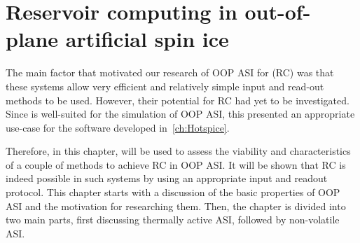 \chapter{Reservoir computing in out-of-plane artificial spin ice}\label{ch:Applications} %

The main factor that motivated our research of OOP ASI for  (RC) was that these systems allow very efficient and relatively simple input and read-out methods to be used.
However, their potential for RC had yet to be investigated.
Since \hotspice is well-suited for the simulation of OOP ASI, this presented an appropriate use-case for the software developed in~\cref{ch:Hotspice}. \par %
Therefore, in this chapter, \hotspice will be used to assess the viability and characteristics of a couple of methods to achieve RC in OOP ASI.
It will be shown that RC is indeed possible in such systems by using an appropriate input and readout protocol.
This chapter starts with a discussion of the basic properties of OOP ASI and the motivation for researching them.
Then, the chapter is divided into two main parts, first discussing thermally active ASI, followed by non-volatile ASI.

